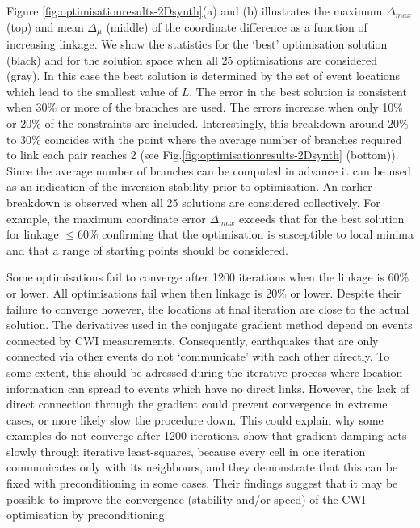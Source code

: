 \documentclass[extra]{gji}
\begin{document}
Figure \ref{fig:optimisationresults-2Dsynth}(a) and (b) illustrates
the maximum $\Delta_{max}$ (top) and mean $\Delta_\mu$ (middle) of
the coordinate difference as a function of increasing linkage. We
show the statistics for the `best' optimisation solution (black) and
for the solution space when all 25 optimisations are considered
(gray). In this case the best solution is determined by the set of
event locations which lead to the smallest value of $L$. The error
in the best solution is consistent when 30\% or more of the branches
are used. The errors increase when only 10\% or 20\% of the
constraints are included. Interestingly, this breakdown around 20\%
to 30\% coincides with the point where the average number of
branches required to link each pair reaches 2 (see
Fig.\ref{fig:optimisationresults-2Dsynth} (bottom)). Since the
average number of branches can be computed in advance it can be used
as an indication of the inversion stability prior to optimisation.
An earlier breakdown is observed when all 25 solutions are
considered collectively. For example, the maximum coordinate error
$\Delta_{max}$ exceeds that for the best solution for linkage
$\leq$60\% confirming that the optimisation is susceptible to local
minima and that a range of starting points should be considered.

Some optimisations
fail to converge after 1200 iterations when the linkage is 60\% or lower. All optimisations
fail when then linkage is 20\% or lower. Despite their failure to converge however, the locations
at final iteration are close to the actual solution. The derivatives used in the conjugate gradient method
depend on events connected by CWI measurements. Consequently,
earthquakes that are only connected via other events do not `communicate' with each other
directly. To some extent, this should be adressed during the iterative process where location information
can spread to events which have no direct links. However, the
lack of direct connection through the gradient could prevent convergence in extreme cases, or more likely
slow the procedure down. This could explain why some
examples do not converge after 1200 iterations.
\citet{dr_VanDecar94a} show that gradient damping acts
slowly through iterative least-squares, because
 every cell in one iteration communicates only with its neighbours, and they demonstrate that this can be
fixed with preconditioning in some cases. Their findings suggest that it may be possible to improve
the convergence (stability and/or speed) of the CWI optimisation by preconditioning.
\end{document}

